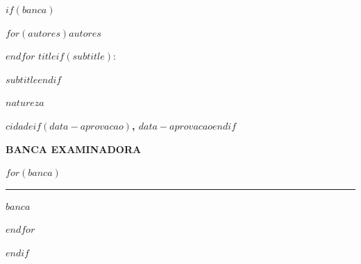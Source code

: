 $if(banca)$
\begin{center}
\bfseries
$for(autores)$\MakeUppercase{$autores$}\par$endfor$
\vspace{2cm}
\MakeUppercase{$title$}$if(subtitle)$:\par\mdseries $subtitle$$endif$\par
\end{center}
\vspace{1cm}
\begin{flushright}
\begin{minipage}{\dimexpr\textwidth-8cm\relax}
\singlespacing\small\setlength{\parindent}{0pt}
$natureza$
\end{minipage}
\end{flushright}
\vfill
\begin{center}
{\bfseries\MakeUppercase{$cidade$}$if(data-aprovacao)$, $data-aprovacao$$endif$\par}
\vspace{1.5em}
{\bfseries BANCA EXAMINADORA\par}
\vspace{2.5em}
$for(banca)$
\rule{8cm}{0.4pt}\par
{\small $banca$\par}
\vspace{2em}
$endfor$
\end{center}
\vfill
\clearpage
$endif$
